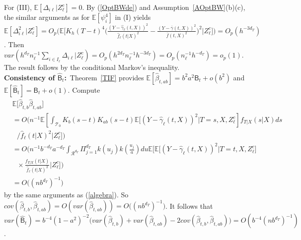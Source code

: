 \documentclass[lettersize, 12pt]{article}
\begin{document}

For (III),
$\mathbb{E}[\Delta_{i\ell}|Z_\ell^c] = 0$.
By (\ref{OptBWde}) and Assumption~\ref{AOptBW}(b)(c), the similar arguments as for $\mathbb{E}[\psi_{i}^4]$ in (I) yields
$\mathbb{E}[\Delta_{i\ell}^2|Z_\ell^c] = O_p\bigg(\mathbb{E}\bigg[K_h(T-t)^4\bigg(
\frac{(Y - \hat \gamma_\ell(t,X))^2}{\hat f_\ell(t|X)^2}
-
\frac{(Y - \bar \gamma(t,X))^2}{\bar f(t,X)^2}
\bigg)^2
\bigg|Z_\ell^c
\bigg]\bigg) 
= 
O_p(h^{-3d_T})$.
Then
$var(
h^{d_T} n_\ell^{-1} \sum_{i \in I_\ell} \Delta_{i\ell}|Z_\ell^c
) = O_p(h^{2d_T} n_\ell^{-1} h^{-3d_T}) = O_p(n_\ell^{-1} h^{-d_T}) = o_p(1)$.
The result follows by the conditional Markov's inequality.
\\[3pt]
\textbf{Consistency of $\hat{\mathsf{B}}_t$:}\
Theorem~\ref{TIF} provides $\mathbb{E}[\hat\beta_{t,ab}] = b^2 a^2 \mathsf{B}_t + o(b^2)$ and $\mathbb{E}[\hat{\mathsf{B}}_t] = \mathsf{B}_t + o(1)$.
Compute
\begin{align*}
&\mathbb{E}\big[\hat\beta_{t,b} \hat\beta_{t,ab}\big] \\
&= O\Big(n^{-1}
\mathbb{E}\left[
\int_{\mathcal{T}_0}K_b(s-t)K_{ab}(s-t) \mathbb{E}\Big[(Y - \hat\gamma_\ell(t, X))^2\big|T=s,X,Z_\ell^c\right] f_{T|X}(s|X) ds 
\\
&\ \ \ /\hat f_\ell(t|X)^2 \Big|Z_\ell^c\Big]
\Big)
\\
&= O\bigg(
n^{-1}b^{-d_T} a^{-d_T} \int_{\mathcal{R}^{d_T}} \Pi_{j=1}^{d_T} k(u_j) k\left(\frac{u_j}{a}\right) du \mathbb{E}\bigg[
 \mathbb{E}\big[(Y - \hat\gamma_\ell(t, X))^2\big|T=t,X,Z_\ell^c\big]
 \\
 &\ \ \ \times \frac{f_{T|X}(t|X)}{\hat f_\ell(t|X)^2}
\bigg|Z_\ell^c 
\bigg]
\bigg)
\\
&= O\big((nb^{d_T})^{-1}\big)
\end{align*}
by the same arguments as (\ref{algebra}).
So $cov(\hat\beta_{t,b}, \hat\beta_{t,ab})  = O(var(\hat\beta_{t,ab})) = O\big((nb^{d_T})^{-1}\big)$. 
It follows that $var(\hat{\mathsf{B}}_t) = b^{-4}(1-a^2)^{-2}\big( var(\hat\beta_{t,b}) + var(\hat\beta_{t,ab}) - 2cov(\hat\beta_{t,b}, \hat\beta_{t,ab}) \big) = O(b^{-4}(nb^{d_T})^{-1})$.
\end{document}
